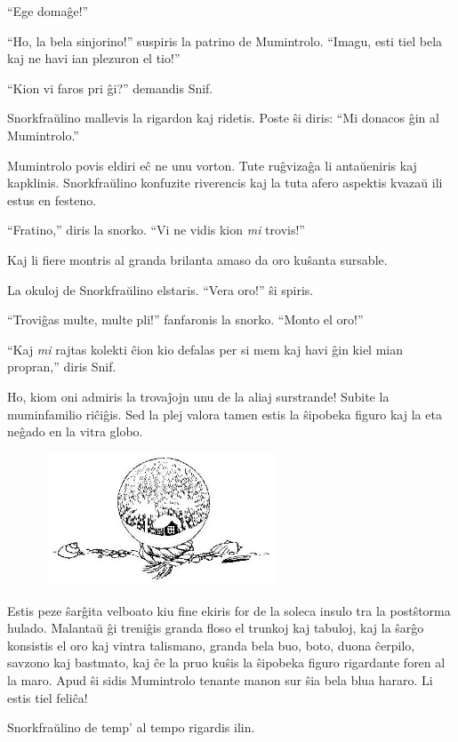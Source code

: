 ``Ege domaĝe!''

``Ho, la bela sinjorino!'' suspiris la patrino de Mumintrolo. ``Imagu, esti tiel bela kaj ne havi ian plezuron el tio!''

``Kion vi faros pri ĝi?'' demandis Snif.

Snorkfraŭlino mallevis la rigardon kaj ridetis. Poste ŝi diris: ``Mi donacos ĝin al Mumintrolo.''

Mumintrolo povis eldiri eĉ ne unu vorton. Tute ruĝvizaĝa li antaŭeniris kaj kapklinis. Snorkfraŭlino konfuzite riverencis kaj la tuta afero aspektis kvazaŭ ili estus en festeno.

``Fratino,'' diris la snorko. ``Vi ne vidis kion \emph{mi} trovis!''

Kaj li fiere montris al granda brilanta amaso da oro kuŝanta sursable.

La okuloj de Snorkfraŭlino elstaris. ``Vera oro!'' ŝi spiris.

``Troviĝas multe, multe pli!'' fanfaronis la snorko. ``Monto el oro!''

``Kaj \emph{mi} rajtas kolekti ĉion kio defalas per si mem kaj havi ĝin kiel mian propran,'' diris Snif.

Ho, kiom oni admiris la trovaĵojn unu de la aliaj surstrande! Subite la muminfamilio riĉiĝis. Sed la plej valora tamen estis la ŝipobeka figuro kaj la eta neĝado en la vitra globo.

\begin{figure}[htbp]
\centering
\includegraphics[width=200pt,height=112pt]{_21.jpg}
\caption{}
\label{_21}
\end{figure}

Estis peze ŝarĝita velboato kiu fine ekiris for de la soleca insulo tra la postŝtorma hulado. Malantaŭ ĝi treniĝis granda floso el trunkoj kaj tabuloj, kaj la ŝarĝo konsistis el oro kaj vintra talismano, granda bela buo, boto, duona ĉerpilo, savzono kaj bastmato, kaj ĉe la pruo kuŝis la ŝipobeka figuro rigardante foren al la maro. Apud ŝi sidis Mumintrolo tenante manon sur ŝia bela blua hararo. Li estis tiel feliĉa!

Snorkfraŭlino de temp' al tempo rigardis ilin.

